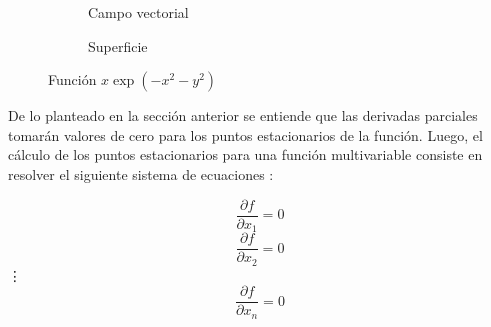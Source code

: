 \begin{figure}[h]  
\centering 
\begin{subfigure}[b]{0.49\linewidth}

 \caption{Campo vectorial} \label{fig:M1} 
\end{subfigure}
\begin{subfigure}[b]{0.49\linewidth}
  
 \caption{Superficie} \label{fig:M1} 

\end{subfigure}
 \caption{Función $x  \exp(-x^2-y^2)$ } \label{fig: gradiente} 

\end{figure}

De lo planteado en la sección anterior se entiende que las derivadas parciales tomarán valores de cero para los puntos estacionarios de la función. Luego, el cálculo de los puntos estacionarios para una función multivariable consiste en resolver el siguiente sistema de  ecuaciones \cite{soliman_mathematical_2012}:
\begin{center}
\begin{equation}\label{eq:gradient1}
 \frac{\partial f}{\partial x_1}=0
\end{equation}
\begin{equation}\label{eq:gradient2}
 \frac{\partial f}{\partial x_2}=0
\end{equation}
\vdots
\begin{equation}\label{eq:gradient3}
 \frac{\partial f}{\partial x_n}=0
\end{equation}
\end{center}

